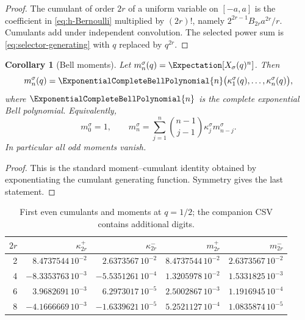 \documentclass[11pt,oneside]{article}
\numberwithin{equation}{section}
\newtheorem{corollary}[theorem]{Corollary}
\theoremstyle{definition}
\theoremstyle{remark}
\begin{document}
\begin{proof}
The cumulant of order $2r$ of a uniform variable on $[-a,a]$ is the coefficient in
\eqref{eq:h-Bernoulli} multiplied by $(2r)!$, namely
$2^{2r-1}B_{2r}a^{2r}/r$.  Cumulants add under independent convolution.  The selected
power sum is \eqref{eq:selector-generating} with $q$ replaced by $q^{2r}$.
\end{proof}

\begin{corollary}[Bell moments]
\label{cor:bell-moments}
Let $m_n^\sigma(q)=\Expectation[X_\sigma(q)^n]$.  Then
\begin{equation}
 m_n^\sigma(q)=\ExponentialCompleteBellPolynomial{n}\bigl(\kappa_1^\sigma(q),\ldots,
 \kappa_n^\sigma(q)\bigr),
 \label{eq:bell-moments}
\end{equation}
where $\ExponentialCompleteBellPolynomial{n}$ is the complete exponential Bell polynomial.  Equivalently,
\begin{equation}
 m_0^\sigma=1,
 \qquad
 m_n^\sigma=\sum_{j=1}^n\binom{n-1}{j-1}
 \kappa_j^\sigma m_{n-j}^\sigma.
 \label{eq:moment-recurrence}
\end{equation}
In particular all odd moments vanish.
\end{corollary}

\begin{proof}
This is the standard moment--cumulant identity obtained by exponentiating the cumulant
generating function.  Symmetry gives the last statement.
\end{proof}

\begin{table}[H]
\centering
\caption{First even cumulants and moments at $q=1/2$; the companion CSV contains
additional digits.}
\label{tab:cumulants}
\begin{tabular}{r@{\qquad}rr@{\qquad}rr}
\toprule
$2r$ & $\kappa_{2r}^+$ & $\kappa_{2r}^-$ & $m_{2r}^+$ & $m_{2r}^-$\\
\midrule
2 & $8.4737544\,10^{-2}$ & $2.6373567\,10^{-2}$ & $8.4737544\,10^{-2}$ & $2.6373567\,10^{-2}$\\
4 & $-8.3353763\,10^{-3}$ & $-5.5351261\,10^{-4}$ & $1.3205978\,10^{-2}$ & $1.5331825\,10^{-3}$\\
6 & $3.9682691\,10^{-3}$ & $6.2973017\,10^{-5}$ & $2.5002867\,10^{-3}$ & $1.1916945\,10^{-4}$\\
8 & $-4.1666669\,10^{-3}$ & $-1.6339621\,10^{-5}$ & $5.2521127\,10^{-4}$ & $1.0835874\,10^{-5}$\\
\bottomrule
\end{tabular}
\end{table}
\end{document}
